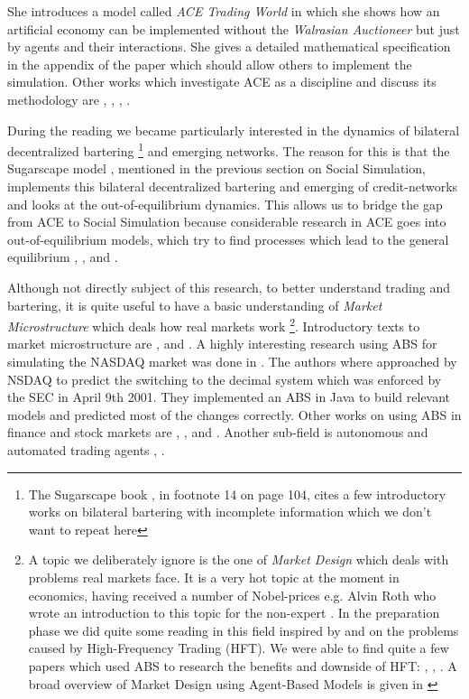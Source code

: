 She introduces a model called \textit{ACE Trading World} in which she shows how an artificial economy can be implemented without the \textit{Walrasian Auctioneer} but just by agents and their interactions. She gives a detailed mathematical specification in the appendix of the paper which should allow others to implement the simulation. Other works which investigate ACE as a discipline and discuss its methodology are \cite{tesfatsion_agent-based_2002}, \cite{richiardi_agent-based_2007}, \cite{ballot_agent-based_2015}, \cite{blume_introduction_2015}.

During the reading we became particularly interested in the dynamics of bilateral decentralized bartering \footnote{The Sugarscape book \cite{epstein_growing_1996}, in footnote 14 on page 104, cites a few introductory works on bilateral bartering with incomplete information which we don't want to repeat here} and emerging networks. The reason for this is that the Sugarscape model \cite{epstein_growing_1996}, mentioned in the previous section on Social Simulation, implements this bilateral decentralized bartering and emerging of credit-networks and looks at the out-of-equilibrium dynamics. This allows us to bridge the gap from ACE to Social Simulation because considerable research in ACE goes into out-of-equilibrium models, which try to find processes which lead to the general equilibrium \cite{gintis_emergence_2006}, \cite{gintis_dynamics_2007}, \cite{arthur_out--equilibrium_2006} and \cite{botta_functional_2011}.

Although not directly subject of this research, to better understand trading and bartering, it is quite useful to have a basic understanding of \textit{Market Microstructure} which deals how real markets work \footnote{A topic we deliberately ignore is the one of \textit{Market Design} which deals with problems real markets face. It is a very hot topic at the moment in economics, having received a number of Nobel-prices e.g. Alvin Roth who wrote an introduction to this topic for the non-expert \cite{roth_who_2015}. In the preparation phase we did quite some reading in this field inspired by \cite{sornette_crashes_2011} and \cite{budish_editors_2015} on the problems caused by High-Frequency Trading (HFT). We were able to find quite a few papers which used ABS to research the benefits and downside of HFT: \cite{wah_latency_2013}, \cite{leal_rock_2016}, \cite{yim_effect_2015}. A broad overview of Market Design using Agent-Based Models is given in \cite{marks_chapter_2006}}. Introductory texts to market microstructure are \cite{harris_trading_2003}, \cite{baker_market_2013} and \cite{lehalle_market_2013}. A highly interesting research using ABS for simulating the NASDAQ market was done in \cite{darley_nasdaq_2007}. The authors where approached by NSDAQ to predict the switching to the decimal system which was enforced by the SEC in April 9th 2001. They implemented an ABS in Java to build relevant models and predicted most of the changes correctly. Other works on using ABS in finance and stock markets are \cite{lebaron_agent-based_2000}, \cite{lebaron_building_2002}, \cite{streltchenko_multi-agent_2005} and \cite{panayi_agent-based_2012}. Another sub-field is autonomous and automated trading agents \cite{mackie-mason_chapter_2006}, \cite{toulis_mertacor:_2006}.

